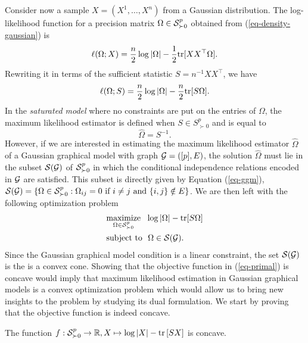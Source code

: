 Consider now a sample $X = (X^{1}, \ldots, X^{n})$ from a Gaussian distribution. The log-likelihood function for a precision matrix $\Omega \in \S^p_{\succ 0}$ obtained from (\ref{eq-density-gaussian}) is
\begin{equation*}
    \ell(\Omega; X) = \frac{n}{2} \log |\Omega| - \frac{1}{2}\tr[XX^\top\Omega].
\end{equation*}
Rewriting it in terms of the sufficient statistic $S = n^{-1}XX^\top$, we have
\begin{equation} \label{eq-likelihood}
    \ell(\Omega; S) = \frac{n}{2}\log |\Omega| - \frac{n}{2}\tr[S\Omega].
\end{equation}
In the \textit{saturated model} where no constraints are put on the entries of $\Omega$, the maximum likelihood estimator is defined when $S \in S^p_{\succ 0}$ and is equal to
\begin{equation*}
    \hat\Omega = S^{-1}.
\end{equation*}
However, if we are interested in estimating the maximum likelihood estimator $\hat\Omega$ of a Gaussian graphical model with graph $\G = ([p], E)$, the solution $\hat\Omega$ must lie in the subset $\S(\G)$ of $\S^p_{\succ 0}$ in which the conditional independence relations encoded in $\G$ are satisfied. This subset is directly given by Equation (\ref{eq-ggm}), $\S(\G) = \{ \Omega \in \S^p_{\succ 0} : \Omega_{ij} = 0 \textrm{ if } i \neq j \textrm{ and } \eset{i,j} \notin E \}$. We are then left with the following optimization problem
\begin{align} \label{eq-primal}
    \begin{split}
        &\underset{\Omega \in \S^p_{\succ 0}}{\textrm{maximize}}\ \  \log |\Omega| - \tr[S\Omega]\\
        &\textrm{subject to}\ \ \Omega \in \S(\G).
    \end{split}
\end{align}
Since the Gaussian graphical model condition is a linear constraint, the set $\S(\G)$ is the is a convex cone. Showing that the objective function in (\ref{eq-primal}) is concave would imply that maximum likelihood estimation in Gaussian graphical models is a convex optimization problem which would allow us to bring new insights to the problem by studying its dual formulation. We start by proving that the objective function is indeed concave.
\begin{lemma}
    The function $f : \S^p_{\succ 0} \rightarrow \R, X \mapsto \log |X| - \trB{SX}$ is concave.
\end{lemma}
